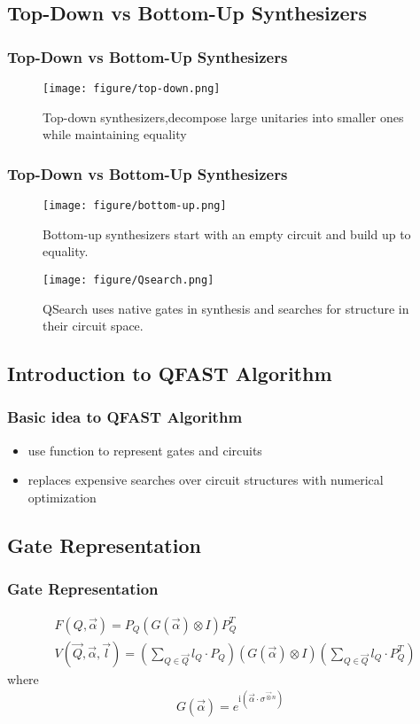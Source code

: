 \documentclass[aspectratio=1610]{beamer}
\begin{document}
\subsection{Top-Down vs Bottom-Up Synthesizers}
\begin{frame}
\frametitle{Top-Down vs Bottom-Up Synthesizers}
\begin{figure}
  \texttt{[image: figure/top-down.png]}
  \caption{Top-down synthesizers,decompose large unitaries into smaller ones while maintaining equality}
\end{figure}
\end{frame}
\begin{frame}
  \frametitle{Top-Down vs Bottom-Up Synthesizers}
  \begin{figure}
    \texttt{[image: figure/bottom-up.png]}
    \caption{Bottom-up synthesizers start with an empty circuit and build up to equality.}
  \end{figure}
  \begin{figure}
    \texttt{[image: figure/Qsearch.png]}
    \caption{QSearch uses native gates in synthesis and searches for structure in their circuit space.}
  \end{figure}
\end{frame}
\subsection{Introduction to QFAST Algorithm}
\begin{frame}
\frametitle{Basic idea to QFAST Algorithm}
\begin{itemize}
  \item use function to represent gates and circuits
  \item replaces expensive searches over circuit structures with numerical optimization
\end{itemize}
\end{frame}

\subsection{Gate Representation}
\begin{frame}
\frametitle{Gate Representation}

\begin{align}
  &F(Q, \vec{\alpha})=P_{Q}(G(\vec{\alpha}) \otimes I) P_{Q}^{T}\\
  &V(\vec{Q}, \vec{\alpha}, \vec{l})=\left(\sum_{Q \in \vec{Q}} l_{Q} \cdot P_{Q}\right)(G(\vec{\alpha}) \otimes I)\left(\sum_{Q \in \vec{Q}} l_{Q} \cdot P_{Q}^{T}\right)
\end{align}
where
\begin{align}
  G(\vec{\alpha})=e^{\mathrm{i}\left(\vec{\alpha} \cdot \sigma^{\vec{\otimes} n}\right)}
\end{align}
\end{frame}
\end{document}
